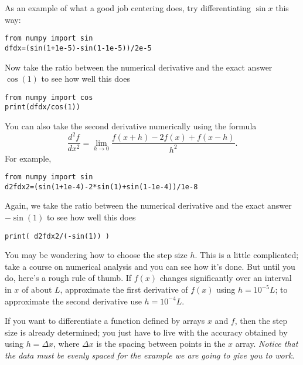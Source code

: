 As an example of what a good job centering does, try differentiating
$\sin{x}$ this way:
\begin{Verbatim}
from numpy import sin
dfdx=(sin(1+1e-5)-sin(1-1e-5))/2e-5
\end{Verbatim}
Now take the ratio between the numerical derivative and the exact answer
$\cos(1)$ to see how well this does
\begin{Verbatim}
from numpy import cos
print(dfdx/cos(1))
\end{Verbatim}
You can also take the second derivative numerically using the formula
\begin{equation}
\frac{d^2 f }{ dx^2} = \lim_{ h \rightarrow 0}
\frac{f(x+h)-2 f(x)+f(x-h) }{ h^2} .
\end{equation}
For example,
\begin{Verbatim}
from numpy import sin
d2fdx2=(sin(1+1e-4)-2*sin(1)+sin(1-1e-4))/1e-8
\end{Verbatim}
Again, we take the ratio between the numerical derivative and the exact
answer $-\sin(1)$ to see how well this does
\begin{Verbatim}
print( d2fdx2/(-sin(1)) )
\end{Verbatim}

You may be wondering how to choose the step size $h$. This is a little
complicated; take a course on numerical analysis and you can see how it's
done. But until you do, here's a rough rule of thumb. If $f(x)$ changes
significantly over an interval in $x$ of about $L$, approximate the first
derivative of $f(x)$ using $h=10^{-5}L$; to approximate the second derivative
use $h=10^{-4}L$.

 If you want to differentiate a function
defined by arrays $x$ and $f$, then the step size is already determined; you
just have to live with the accuracy obtained by using $h=\Delta x$, where
$\Delta x$ is the spacing between points in the $x$ array.  {\it Notice that
the data must be evenly spaced for the example we are going to give you to
work.}

